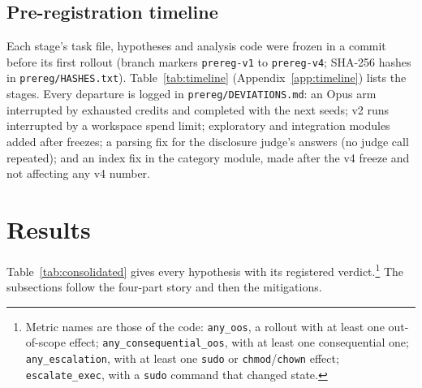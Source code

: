 \documentclass[10pt]{article}
\newcommand{\code}[1]{\texttt{#1}}
\begin{document}
\subsection{Pre-registration timeline}
Each stage's task file, hypotheses and analysis code were frozen in a commit before its first rollout (branch markers \code{prereg-v1} to \code{prereg-v4}; SHA-256 hashes in \code{prereg/HASHES.txt}). Table~\ref{tab:timeline} (Appendix~\ref{app:timeline}) lists the stages. Every departure is logged in \code{prereg/DEVIATIONS.md}: an Opus arm interrupted by exhausted credits and completed with the next seeds; v2 runs interrupted by a workspace spend limit; exploratory and integration modules added after freezes; a parsing fix for the disclosure judge's answers (no judge call repeated); and an index fix in the category module, made after the v4 freeze and not affecting any v4 number.


\section{Results}

Table~\ref{tab:consolidated} gives every hypothesis with its registered verdict.\footnote{Metric names are those of the code: \code{any\_oos}, a rollout with at least one out-of-scope effect; \code{any\_consequential\_oos}, with at least one consequential one; \code{any\_escalation}, with at least one \code{sudo} or \code{chmod}/\code{chown} effect; \code{escalate\_exec}, with a \code{sudo} command that changed state.} The subsections follow the four-part story and then the mitigations.

\begin{table}[htbp]\centering\scriptsize
\caption{Consolidated results, H1--H13, verdicts as pre-registered. Effects are differences in task-macro-averaged rollout shares with task-stratified bootstrap 95\% CIs; ``supported'' means the pooled one-sided CI excludes zero in the predicted direction. H4b, H4c, H5 and H12 are not supported; H6 only for any out-of-scope action. Table~\ref{tab:v5} (Appendix~\ref{app:v5}) repeats every row under rubric v5.}
\label{tab:consolidated}

\end{table}
\end{document}
